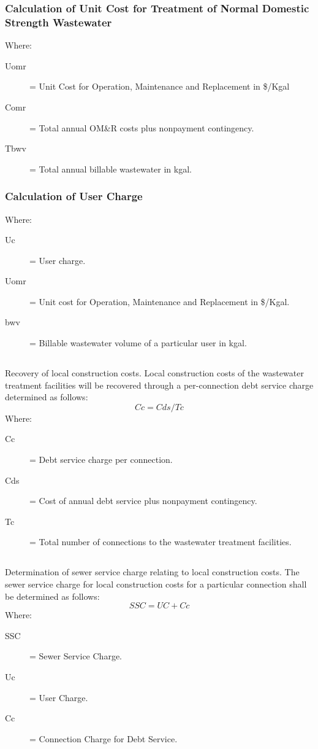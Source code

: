 \subsubsection{Calculation of Unit Cost for Treatment of Normal Domestic Strength Wastewater}
Where:
\begin{description}
\item[Uomr] = Unit Cost for Operation, Maintenance and Replacement in \$/Kgal
\item[Comr] = Total annual OM\&R costs plus nonpayment contingency.
\item[Tbwv] = Total annual billable wastewater in kgal.
\end{description}
\subsubsection{Calculation of User Charge}
Where:
\begin{description}
\item[Uc] = User charge.
\item[Uomr] = Unit cost for Operation, Maintenance and Replacement in \$/Kgal.
\item[bwv] = Billable wastewater volume of a particular user in kgal.
\end{description}
\subsection{}
Recovery of local construction costs.  Local construction costs of the wastewater treatment facilities will be recovered through a per-connection debt service charge determined as follows:
\begin{equation*}
Cc = Cds/Tc
\end{equation*}
Where:
\begin{description}
\item[Cc] = Debt service charge per connection.
\item[Cds] = Cost of annual debt service plus nonpayment contingency.
\item[Tc] = Total number of connections to the wastewater treatment facilities.
\end{description}
\subsection{}
Determination of sewer service charge relating to local construction costs.  The sewer service charge for local construction costs for a particular connection shall be determined as follows:
\begin{equation*}
SSC = UC + Cc
\end{equation*}
Where:
\begin{description}
\item[SSC] = Sewer Service Charge.
\item[Uc] = User Charge.
\item[Cc] = Connection Charge for Debt Service.
\end{description}
